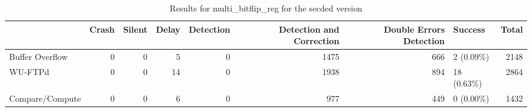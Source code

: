 \begin{table}[t]
	\centering
	\caption{Results for multi_bitflip_reg for the secded version}
	\label{table:end_sim_by_status_secded_2_multi_bitflip_reg}
	\begin{tabular}{lrrrrrrlr}
		\toprule
		                & Crash & Silent & Delay & Detection & Detection and Correction & Double Errors Detection & Success     & Total \\
		\midrule
		Buffer Overflow & 0     & 0      & 5     & 0         & 1475                     & 666                     & 2 (0.09\%)  & 2148  \\
		WU-FTPd         & 0     & 0      & 14    & 0         & 1938                     & 894                     & 18 (0.63\%) & 2864  \\
		Compare/Compute & 0     & 0      & 6     & 0         & 977                      & 449                     & 0 (0.00\%)  & 1432  \\
		\bottomrule
	\end{tabular}
\end{table}
